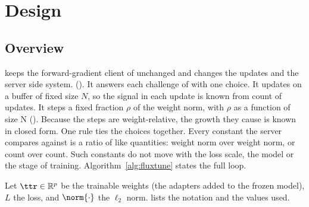 \section{\sys Design}
\label{sec:design}
\label{sec:fluxtune}

\subsection{Overview}
\label{sec:ft:overview}

\sys keeps the forward-gradient client of 
unchanged and changes the updates and the server side system. (). It
answers each challenge of  with one choice. It
updates on a buffer of fixed size $N$, so the signal in each update is
known from count of updates. It steps a fixed fraction $\rho$ of the weight norm,
with $\rho$ as a function of size N (). Because the
steps are weight-relative, the growth they cause is known in closed
form.  One rule ties the
choices together. Every constant the server compares against is a
ratio of like quantities: weight norm over weight norm, or count over
count. Such constants do not move with the loss scale, the model or the
stage of training. Algorithm~\ref{alg:fluxtune} states the full loop.

Let $\ttr\in\mathbb{R}^p$ be the trainable weights (the adapters added
to the frozen model), $L$ the loss, and $\norm{\cdot}$ the $\ell_2$
norm.  lists the notation and the values used.


